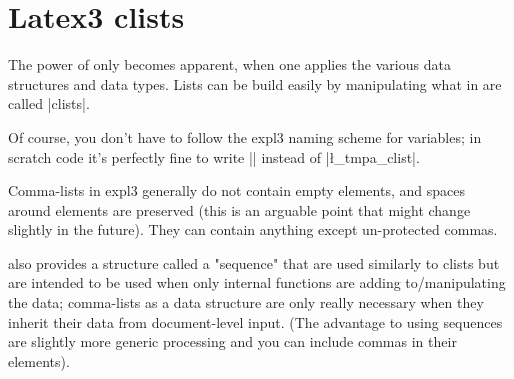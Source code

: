
\section{Latex3 clists}

The power of  only becomes apparent, when one applies the various data structures and data types. Lists can be build easily by manipulating
what in  are called |clists|.


Of course, you don't have to follow the expl3 naming scheme for variables; in scratch code it's perfectly fine to write |\foo| instead of |\l_tmpa_clist|.

Comma-lists in expl3 generally do not contain empty elements, and spaces around elements are preserved (this is an arguable point that might change slightly in the future). They can contain anything except un-protected commas.

 also provides a structure called a "sequence" that are used similarly to clists but are intended to be used when only internal functions are adding to/manipulating the data; comma-lists as a data structure are only really necessary when they inherit their data from document-level input. (The advantage to using sequences are slightly more generic processing and you can include commas in their elements).

